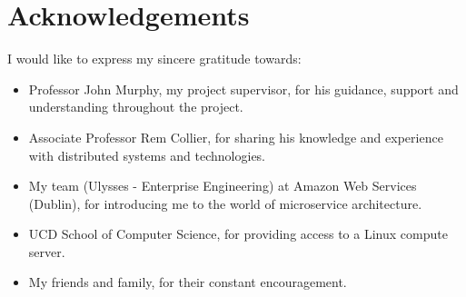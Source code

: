 \chapter*{Acknowledgements}

I would like to express my sincere gratitude towards:
\begin{itemize}
  \item Professor John Murphy, my project supervisor, for his guidance, support and understanding throughout the project.
  \item Associate Professor Rem Collier, for sharing his knowledge and experience with distributed systems and technologies.
  \item My team (Ulysses - Enterprise Engineering) at Amazon Web Services (Dublin), for introducing me to the world of microservice architecture.
  \item UCD School of Computer Science, for providing access to a Linux compute server.
  \item My friends and family, for their constant encouragement.
\end{itemize}
